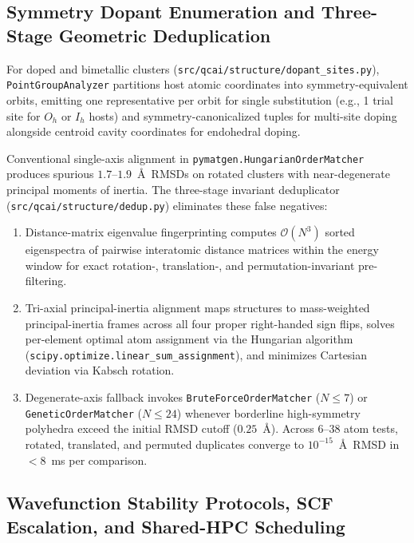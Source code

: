 \documentclass[journal=jctcce,manuscript=article]{achemso}
\begin{document}
\subsection{Symmetry Dopant Enumeration and Three-Stage Geometric Deduplication}

For doped and bimetallic clusters (\texttt{src/qcai/structure/dopant\_sites.py}), \texttt{PointGroupAnalyzer}\cite{ong2013pymatgen} partitions host atomic coordinates into symmetry-equivalent orbits, emitting one representative per orbit for single substitution (e.g., 1 trial site for $O_h$ or $I_h$ hosts) and symmetry-canonicalized tuples for multi-site doping alongside centroid cavity coordinates for endohedral doping.

Conventional single-axis alignment in \texttt{pymatgen.HungarianOrderMatcher} produces spurious $1.7\text{--}1.9$~\AA\ RMSDs on rotated clusters with near-degenerate principal moments of inertia. The three-stage invariant deduplicator (\texttt{src/qcai/structure/dedup.py}) eliminates these false negatives:
\begin{enumerate}
  \item Distance-matrix eigenvalue fingerprinting computes $\mathcal{O}(N^3)$ sorted eigenspectra of pairwise interatomic distance matrices within the energy window for exact rotation-, translation-, and permutation-invariant pre-filtering.
  \item Tri-axial principal-inertia alignment maps structures to mass-weighted principal-inertia frames across all four proper right-handed sign flips, solves per-element optimal atom assignment via the Hungarian algorithm\cite{kuhn1955hungarian} (\texttt{scipy.optimize.linear\_sum\_assignment}), and minimizes Cartesian deviation via Kabsch rotation.\cite{kabsch1976}
  \item Degenerate-axis fallback invokes \texttt{BruteForceOrderMatcher} ($N \le 7$) or \texttt{GeneticOrderMatcher} ($N \le 24$) whenever borderline high-symmetry polyhedra exceed the initial RMSD cutoff ($0.25$~\AA). Across 6--38 atom tests, rotated, translated, and permuted duplicates converge to $10^{-15}$~\AA\ RMSD in $< 8$~ms per comparison.
\end{enumerate}

\subsection{Wavefunction Stability Protocols, SCF Escalation, and Shared-HPC Scheduling}
\end{document}
